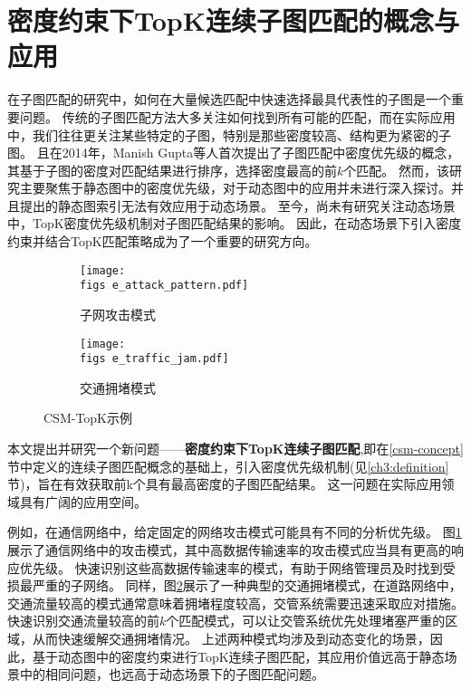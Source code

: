 \section{密度约束下TopK连续子图匹配的概念与应用}
在子图匹配的研究中，如何在大量候选匹配中快速选择最具代表性的子图是一个重要问题。
传统的子图匹配方法大多关注如何找到所有可能的匹配，而在实际应用中，我们往往更关注某些特定的子图，特别是那些密度较高、结构更为紧密的子图。
且在2014年，Manish Gupta等人首次提出了子图匹配中密度优先级的概念\cite{static-topk-Gupta-DBLP:conf/icde/GuptaGYCH14}，其基于子图的密度对匹配结果进行排序，选择密度最高的前$k$个匹配。
然而，该研究主要聚焦于静态图中的密度优先级，对于动态图中的应用并未进行深入探讨。并且提出的静态图索引无法有效应用于动态场景。
至今，尚未有研究关注动态场景中，TopK密度优先级机制对子图匹配结果的影响。
因此，在动态场景下引入密度约束并结合TopK匹配策略成为了一个重要的研究方向。

\begin{figure}[h!]
    \def\wscorevone{0.49}
    \centering
        \begin{subfigure}[t]{\wscorevone\linewidth}
            \centering
            \resizebox{\linewidth}{!}
            {
                \texttt{[image: \\figs e\_attack\_pattern.pdf]}
            }
            \caption{子网攻击模式~\cite{static-topk-Gupta-DBLP:conf/icde/GuptaGYCH14}}
            \label{fig:example_attack_pattern}
        \end{subfigure}
        \hfill
        \begin{subfigure}[t]{\wscorevone\linewidth}
            \centering
            \resizebox{\linewidth}{!}
            {
                \texttt{[image: \\figs e\_traffic\_jam.pdf]}
            }
            \caption{交通拥堵模式~\cite{traffic-graph-matching-DBLP:journals/pvldb/SongGCW14}}
            \label{fig:example_traffic_jam}
        \end{subfigure}
        \label{fig:definition}
        \caption{CSM-TopK示例}
    \end{figure}

本文提出并研究一个新问题——\textbf{密度约束下TopK连续子图匹配},即在\ref{csm-concept}节中定义的连续子图匹配概念的基础上，引入密度优先级机制(见\ref{ch3:definition}节)，旨在有效获取前k个具有最高密度的子图匹配结果。
这一问题在实际应用领域具有广阔的应用空间。

例如，在通信网络中，给定固定的网络攻击模式可能具有不同的分析优先级。
图\ref{fig:example_attack_pattern}展示了通信网络中的攻击模式\cite{static-topk-Gupta-DBLP:conf/icde/GuptaGYCH14}，其中高数据传输速率的攻击模式应当具有更高的响应优先级。
快速识别这些高数据传输速率的模式，有助于网络管理员及时找到受损最严重的子网络。
同样，图\ref{fig:example_traffic_jam}展示了一种典型的交通拥堵模式\cite{traffic-graph-matching-DBLP:journals/pvldb/SongGCW14}，在道路网络中，交通流量较高的模式通常意味着拥堵程度较高，交管系统需要迅速采取应对措施。
快速识别交通流量较高的前$k$个匹配模式，可以让交管系统优先处理堵塞严重的区域，从而快速缓解交通拥堵情况。
上述两种模式均涉及到动态变化的场景，因此，基于动态图中的密度约束进行TopK连续子图匹配，其应用价值远高于静态场景中的相同问题，也远高于动态场景下的子图匹配问题。

